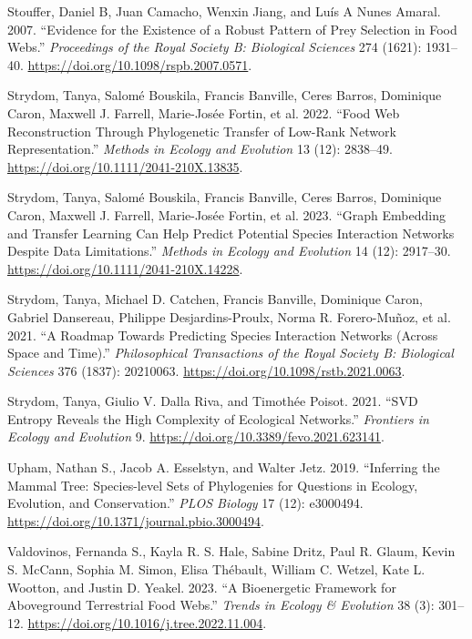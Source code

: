\documentclass[
  letterpaper,
  DIV=11,
  numbers=noendperiod]{scrartcl}
\newlength{\cslhangindent}
\newenvironment{CSLReferences}[2] %
 {\begin{list}{}{%
  \setlength{\itemindent}{0pt}
  \setlength{\leftmargin}{0pt}
  \setlength{\parsep}{0pt}
  \ifodd #1
   \setlength{\leftmargin}{\cslhangindent}
   \setlength{\itemindent}{-1\cslhangindent}
  \fi
  \setlength{\itemsep}{#2\baselineskip}}}
 {\end{list}}
\begin{document}
\begin{CSLReferences}{1}{0}
Stouffer, Daniel B, Juan Camacho, Wenxin Jiang, and Luís A Nunes Amaral.
2007. {``Evidence for the Existence of a Robust Pattern of Prey
Selection in Food Webs.''} \emph{Proceedings of the Royal Society B:
Biological Sciences} 274 (1621): 1931--40.
\url{https://doi.org/10.1098/rspb.2007.0571}.

Strydom, Tanya, Salomé Bouskila, Francis Banville, Ceres Barros,
Dominique Caron, Maxwell J. Farrell, Marie-Josée Fortin, et al. 2022.
{``Food Web Reconstruction Through Phylogenetic Transfer of Low-Rank
Network Representation.''} \emph{Methods in Ecology and Evolution} 13
(12): 2838--49. \url{https://doi.org/10.1111/2041-210X.13835}.

Strydom, Tanya, Salomé Bouskila, Francis Banville, Ceres Barros,
Dominique Caron, Maxwell J. Farrell, Marie-Josée Fortin, et al. 2023.
{``Graph Embedding and Transfer Learning Can Help Predict Potential
Species Interaction Networks Despite Data Limitations.''} \emph{Methods
in Ecology and Evolution} 14 (12): 2917--30.
\url{https://doi.org/10.1111/2041-210X.14228}.

Strydom, Tanya, Michael D. Catchen, Francis Banville, Dominique Caron,
Gabriel Dansereau, Philippe Desjardins-Proulx, Norma R. Forero-Muñoz, et
al. 2021. {``A Roadmap Towards Predicting Species Interaction Networks
(Across Space and Time).''} \emph{Philosophical Transactions of the
Royal Society B: Biological Sciences} 376 (1837): 20210063.
\url{https://doi.org/10.1098/rstb.2021.0063}.

Strydom, Tanya, Giulio V. Dalla Riva, and Timothée Poisot. 2021. {``{SVD
Entropy Reveals} the {High Complexity} of {Ecological Networks}.''}
\emph{Frontiers in Ecology and Evolution} 9.
\url{https://doi.org/10.3389/fevo.2021.623141}.

Upham, Nathan S., Jacob A. Esselstyn, and Walter Jetz. 2019.
{``Inferring the Mammal Tree: {Species-level} Sets of Phylogenies for
Questions in Ecology, Evolution, and Conservation.''} \emph{PLOS
Biology} 17 (12): e3000494.
\url{https://doi.org/10.1371/journal.pbio.3000494}.

Valdovinos, Fernanda S., Kayla R. S. Hale, Sabine Dritz, Paul R. Glaum,
Kevin S. McCann, Sophia M. Simon, Elisa Thébault, William C. Wetzel,
Kate L. Wootton, and Justin D. Yeakel. 2023. {``A Bioenergetic Framework
for Aboveground Terrestrial Food Webs.''} \emph{Trends in Ecology \&
Evolution} 38 (3): 301--12.
\url{https://doi.org/10.1016/j.tree.2022.11.004}.


\end{CSLReferences}
\end{document}
